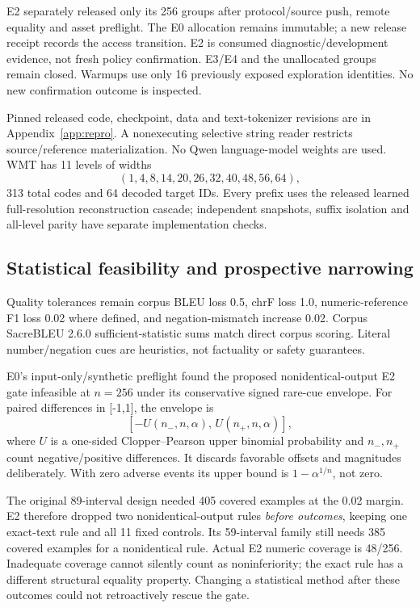 \documentclass[11pt]{article}
\begin{document}
E2 separately released only its 256 groups after protocol/source push, remote equality and asset preflight. The E0 allocation remains immutable; a new release receipt records the access transition. E2 is consumed diagnostic/development evidence, not fresh policy confirmation. E3/E4 and the unallocated groups remain closed. Warmups use only 16 previously exposed exploration identities. No new confirmation outcome is inspected.

Pinned released code, checkpoint, data and text-tokenizer revisions are in Appendix~\ref{app:repro}. A nonexecuting selective string reader restricts source/reference materialization. No Qwen language-model weights are used. WMT has 11 levels of widths
\[
(1,4,8,14,20,26,32,40,48,56,64),
\]
313 total codes and 64 decoded target IDs. Every prefix uses the released learned full-resolution reconstruction cascade; independent snapshots, suffix isolation and all-level parity have separate implementation checks.

\subsection{Statistical feasibility and prospective narrowing}
Quality tolerances remain corpus BLEU loss 0.5, chrF loss 1.0, numeric-reference F1 loss 0.02 where defined, and negation-mismatch increase 0.02. Corpus SacreBLEU 2.6.0 sufficient-statistic sums match direct corpus scoring. Literal number/negation cues are heuristics, not factuality or safety guarantees.

E0's input-only/synthetic preflight found the proposed nonidentical-output E2 gate infeasible at \(n=256\) under its conservative signed rare-cue envelope. For paired differences in [-1,1], the envelope is
\[
[-U(n_-,n,\alpha),\,U(n_+,n,\alpha)],
\]
where \(U\) is a one-sided Clopper--Pearson upper binomial probability and \(n_-,n_+\) count negative/positive differences. It discards favorable offsets and magnitudes deliberately. With zero adverse events its upper bound is \(1-\alpha^{1/n}\), not zero.

The original 89-interval design needed 405 covered examples at the 0.02 margin. E2 therefore dropped two nonidentical-output rules \emph{before outcomes}, keeping one exact-text rule and all 11 fixed controls. Its 59-interval family still needs 385 covered examples for a nonidentical rule. Actual E2 numeric coverage is 48/256. Inadequate coverage cannot silently count as noninferiority; the exact rule has a different structural equality property. Changing a statistical method after these outcomes could not retroactively rescue the gate.
\end{document}
